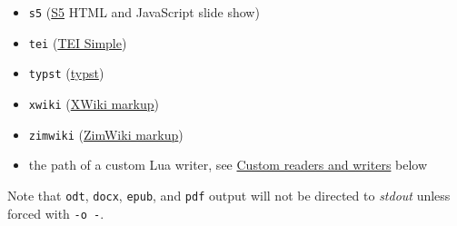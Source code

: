 \documentclass[
  a4paper,
]{article}
\begin{document}
\begin{description}
\begin{itemize}
\item
  \texttt{s5} (\href{https://meyerweb.com/eric/tools/s5/}{S5} HTML and
  JavaScript slide show)
\item
  \texttt{tei} (\href{https://github.com/TEIC/TEI-Simple}{TEI Simple})
\item
  \texttt{typst} (\href{https://typst.app}{typst})
\item
  \texttt{xwiki}
  (\href{https://www.xwiki.org/xwiki/bin/view/Documentation/UserGuide/Features/XWikiSyntax/}{XWiki
  markup})
\item
  \texttt{zimwiki}
  (\href{https://zim-wiki.org/manual/Help/Wiki_Syntax.html}{ZimWiki
  markup})
\item
  the path of a custom Lua writer, see
  \protect\hyperlink{custom-readers-and-writers}{Custom readers and
  writers} below
\end{itemize}

Note that \texttt{odt}, \texttt{docx}, \texttt{epub}, and \texttt{pdf}
output will not be directed to \emph{stdout} unless forced with
\texttt{-o\ -}.


\end{description}
\end{document}
